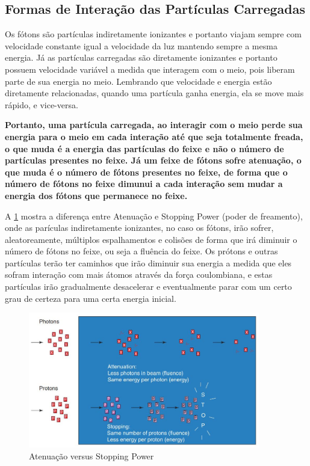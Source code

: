 \documentclass[11pt,a4paper]{article}
\begin{document}
        \subsection{Formas de Interação das Partículas Carregadas}

            
            Os fótons são partículas indiretamente ionizantes e portanto viajam sempre com velocidade constante igual a velocidade da luz mantendo sempre a mesma energia. Já as partículas carregadas são diretamente ionizantes e portanto possuem velocidade variável a medida que interagem com o meio, pois liberam parte de sua energia no meio. Lembrando que velocidade e energia estão diretamente relacionadas, quando uma partícula ganha energia, ela se move mais rápido, e vice-versa.

            \textbf{\textcolor{CarnationPink}{Portanto, uma partícula carregada, ao interagir com o meio perde sua energia para o meio em cada interação até que seja totalmente freada, o que muda é a energia das partículas do feixe e não o número de partículas presentes no feixe. Já um feixe de fótons sofre atenuação, o que muda é o número de fótons presentes no feixe, de forma que o número de fótons no feixe dimunui a cada interação sem mudar a energia dos fótons que permanece no feixe.}}


            A \ref{fig:atenuacaoVsStoppingPower} mostra a diferença entre Atenuação e Stopping Power (poder de freamento), onde as parículas indiretamente ionizantes, no caso os fótons, irão sofrer, aleatoreamente, múltiplos espalhamentos e colisões de forma que irá diminuir o número de fótons no feixe, ou seja a fluência do feixe. Os prótons e outras partículas terão ter caminhos que irão diminuir sua energia a medida que eles sofram interação com mais átomos através da força coulombiana, e estas partículas irão gradualmente desacelerar e eventualmente parar com um certo grau de certeza para uma certa energia inicial.

        
            \begin{figure}[h]
                \centering
                \includegraphics[width=0.9\textwidth]{Imagens/atenuacaoVsStoppingPower.JPG}
                \caption{Atenuação versus Stopping Power}
                \label{fig:atenuacaoVsStoppingPower}                
            \end{figure}
            
\end{document}
